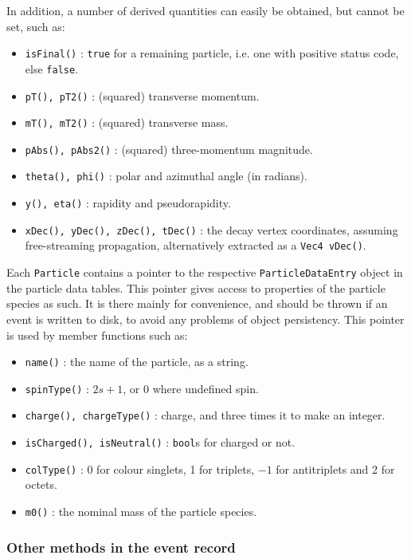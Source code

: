 \documentclass{elsartmod}
\begin{document}
In addition, a number of derived quantities can easily be obtained, 
but cannot be set, such as:
\begin{itemize}
\item \texttt{isFinal()} : 
\texttt{true} for a remaining particle, i.e. one with positive status 
code, else \texttt{false}.
\item \texttt{pT(), pT2()} : 
(squared) transverse momentum.
\item \texttt{mT(), mT2()} : 
(squared) transverse mass.
\item \texttt{pAbs(), pAbs2()} : 
(squared) three-momentum magnitude.
\item \texttt{theta(), phi()} : 
polar and azimuthal angle (in radians).
\item \texttt{y(), eta()} : rapidity and pseudorapidity.
\item \texttt{xDec(), yDec(), zDec(), tDec()} : 
the decay vertex coordinates, assuming free-streaming propagation, 
alternatively extracted as a \texttt{Vec4 vDec()}. 
\end{itemize}

Each \texttt{Particle} contains a pointer to the respective 
\texttt{ParticleDataEntry} object in the particle data tables. This 
pointer gives access to properties of the particle species as such. 
It is there mainly for convenience, and should be thrown if an event 
is written to disk, to avoid any problems of object persistency. 
This pointer is used by member functions such as:
\begin{itemize}
\item \texttt{name()} : 
the name of the particle, as a string.
\item \texttt{spinType()} : $2 s + 1$, or 0 where undefined spin. 
\item \texttt{charge(), chargeType()} : charge, and three times it 
to make an integer.
\item \texttt{isCharged(), isNeutral()} : \texttt{bool}s for charged 
or not.
\item \texttt{colType()} : 0 for colour singlets, 1 for triplets, 
$-1$ for antitriplets and 2 for octets.
\item \texttt{m0()} : 
the nominal mass of the particle species.
\end{itemize}

\subsubsection{Other methods in the event record} 
\end{document}
